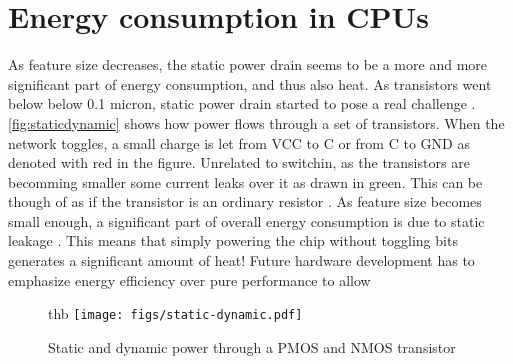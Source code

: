 \section{Energy consumption in CPUs}


As feature size decreases, the static power drain
seems to be a more and more significant part of energy consumption, and thus
also heat. As transistors went below below 0.1 micron, static power drain
started to pose a real challenge \cite{kim2003leakage,martin2002combined}.
\autoref{fig:staticdynamic} shows how power flows through a set of transistors.
When the network toggles, a small charge is let from VCC to C or from C to GND
as denoted with red in the figure.  Unrelated to switchin, as the transistors
are becomming smaller some current leaks over it as drawn in green. This can be
though of as if the transistor is an ordinary resistor \cite{wolf}. As feature
size becomes small enough, a significant part of overall energy consumption is
due to static leakage \cite{nguyen2003minimization}. This means that simply
powering the chip without toggling bits generates a significant amount of heat!
Future hardware development has to emphasize energy efficiency over pure
performance to allow 


\begin{figure}{thb}
    \centering
    \texttt{[image: figs/static-dynamic.pdf]}
    \caption{Static and dynamic power through a PMOS and NMOS transistor}
    \label{fig:staticdynamic}
\end{figure}



